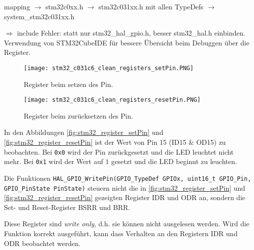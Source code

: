\vspace{3mm}

mapping $\rightarrow$ stm32c0xx.h $\rightarrow$ stm32c031xx.h mit allen TypeDefs $\rightarrow$ system\_stm32c031xx.h

$\Longrightarrow$ include Fehler: statt nur stm32\_hal\_gpio.h, besser stm32\_hal.h einbinden.
\\

Verwendung von STM32CubeIDE für bessere Übersicht beim Debuggen über die Register.
\\

\vspace{3mm}
\begin{figure}[H]
	\texttt{[image: stm32\_c031c6\_clean\_registers\_setPin.PNG]}
	\caption{Register beim setzen des Pin.}
	\label{fig:stm32_register_setPin}
\end{figure}

\vspace{3mm}
\begin{figure}[H]
	\texttt{[image: stm32\_c031c6\_clean\_registers\_resetPin.PNG]}
	\caption{Register beim zurücksetzen des Pin.}
	\label{fig:stm32_register_resetPin}
\end{figure}

In den Abbildungen \autoref{fig:stm32_register_setPin} und \autoref{fig:stm32_register_resetPin} ist der Wert von Pin 15 (ID15 \& OD15) zu beobachten. Bei \texttt{0x0} wird der Pin zurückgesetzt und die LED leuchtet nicht mehr. Bei \texttt{0x1} wird der Wert auf $1$ gesetzt und die LED beginnt zu leuchten.

Die Funktionen \texttt{HAL\_GPIO\_WritePin(GPIO\_TypeDef \*GPIOx, uint16\_t GPIO\_Pin, GPIO\_PinState PinState)} steuern nicht die in \autoref{fig:stm32_register_setPin} und \autoref{fig:stm32_register_resetPin} gezeigten Register IDR und ODR an, sondern die Set- und Reset-Register BSRR und BRR. 

Diese Register sind \emph{write only}, d.h. sie können nicht ausgelesen werden.
Wird die Funktion korrekt ausgeführt, kann dass Verhalten an den Registern IDR und ODR beobachtet werden.



























